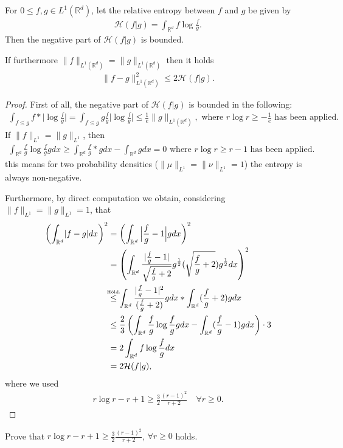 \begin{lemma}
	For $0\le f,g \in  L^{1}(\mathbb{R}^{d} ) $, let the relative entropy between $f$ and $g$ be given by
	\begin{align*}
	\mathcal{H}(f | g) = \int_{\mathbb{R}^{d} } f \log \frac{f}{g}
	.\end{align*}
	Then the negative part of $\mathcal{H}(f|g)$ is bounded.
	
	If furthermore $\|f\|_{L^{1}(\mathbb{R}^{d} ) } = \|g\|_{L^{1} (\mathbb{R}^{d} )}$ then it holds 
	\begin{align*}
	\|f-g\|_{L^{1}(\mathbb{R}^{d} ) }^2 \le 2 \mathcal{H}(f | g)
	.\end{align*}
\end{lemma}
\begin{proof}
First of all, the negative part of $\mathcal{H}(f|g)$ is bounded in the following:
\begin{align*}
\int_{f \le g} f * \Big|\log \frac{f}{g}\Big| =  \int_{f \le  g} g \frac{f}{g} \Big|\log  \frac{f}{g}\Big| \le  \frac{1}{e} \|g\|_{L^{1}(\mathbb{R}^{d} ) }, \mbox{ where }	r \log  r \ge  -\frac{1}{e} \mbox{ has been applied.}
\end{align*}
If $\|f\|_{L^{1}} = \|g\|_{L^{1} } $, then
\begin{align*}
\int_{\mathbb{R}^{d} } \frac{f}{g} \log  \frac{f}{g} g dx \ge \int_{\mathbb{R}^{d} }   \frac{f}{g} * g dx - \int_{\mathbb{R}^{d} }  g dx = 0 \mbox{ where }	r \log  r \ge r-1 \mbox{ has been applied.}
\end{align*}
this means for two probability densities ($\|\mu \|_{L^{1} }=\|\nu \|_{L^{1} } = 1$) the entropy is always non-negative.

Furthermore, by direct computation we obtain, considering   $\|f\|_{L^{1}} = \|g\|_{L^{1} } =1$, that
	\begin{align*}
	\left( \int_{\mathbb{R}^{d} }  \abs{f-g} dx \right)^2 &=  \left( \int_{\mathbb{R}^{d} }   \Big|\frac{f}{g} - 1\Big| g  dx\right) ^2\\
	&= \left( \int_{\mathbb{R}^{d} }   \frac{\abs{\frac{f}{g} - 1}}{\sqrt{\frac{f}{g} + 2}} g^{\frac{1}{2}}(\sqrt{\frac{f}{g}+2})g^{\frac{1}{2}} dx  \right) ^2\\
	&\myS{Höld.}{\le } \int_{\mathbb{R}^{d} }  \frac{\abs{\frac{f}{g}-1}^2}{(\frac{f}{g}+2)}g dx *\int_{\mathbb{R}^{d} } (\frac{f}{g} + 2)g dx\\
	&\le   \frac{2}{3} \left( \int_{\mathbb{R}^{d} } \frac{f}{g} \log \frac{f}{g} g dx - \int_{\mathbb{R}^{d} }  (\frac{f}{g} - 1) g dx \right) \cdot 3\\
	&= 2 \int_{\mathbb{R}^{d} }  f \log \frac{f}{g} dx\\
	&= 2 \mathcal{H}(f|g)
	,\end{align*}
where we used 
	\begin{align*}
	r \log  r - r + 1 \ge  \frac{3}{2} \frac{(r-1)^2}{r+2} \quad \forall  r \ge 0
	.\end{align*}
\end{proof}
\begin{exercise}
	Prove that $	r \log  r - r + 1 \ge  \frac{3}{2} \frac{(r-1)^2}{r+2}$, $\forall  r \ge 0$ holds.
\end{exercise}

